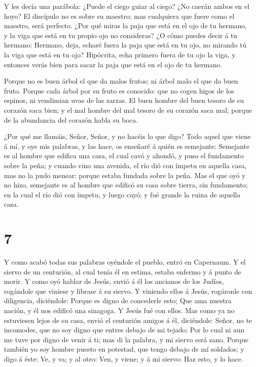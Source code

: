  Y les decía una parábola: ¿Puede el ciego guiar al ciego?
¿No caerán ambos en el hoyo?  El discípulo no es sobre su
maestro; mas cualquiera que fuere como el maestro, será perfecto.
 ¿Por qué miras la paja que está en el ojo de tu hermano, y
la viga que está en tu propio ojo no consideras?  ¿O cómo
puedes decir á tu hermano: Hermano, deja, echaré fuera la paja que está
en tu ojo, no mirando tú la viga que está en tu ojo? Hipócrita, echa
primero fuera de tu ojo la viga, y entonces verás bien para sacar la
paja que está en el ojo de tu hermano.

 Porque no es buen árbol el que da malos frutos; ni árbol
malo el que da buen fruto.  Porque cada árbol por su fruto
es conocido: que no cogen higos de los espinos, ni vendimian uvas de las
zarzas.  El buen hombre del buen tesoro de su corazón saca
bien; y el mal hombre del mal tesoro de su corazón saca mal; porque de
la abundancia del corazón habla su boca.

 ¿Por qué me llamáis, Señor, Señor, y no hacéis lo que
digo?  Todo aquel que viene á mí, y oye mis palabras, y las
hace, os enseñaré á quién es semejante:  Semejante es al
hombre que edifica una casa, el cual cavó y ahondó, y puso el fundamento
sobre la peña; y cuando vino una avenida, el río dió con ímpetu en
aquella casa, mas no la pudo menear: porque estaba fundada sobre la
peña.  Mas el que oyó y no hizo, semejante es al hombre que
edificó su casa sobre tierra, sin fundamento; en la cual el río dió con
ímpetu, y luego cayó; y fué grande la ruina de aquella casa.

\hypertarget{section-6}{%
\section{7}\label{section-6}}

 Y como acabó todas sus palabras oyéndole el pueblo, entró
en Capernaum.  Y el siervo de un centurión, al cual tenía él
en estima, estaba enfermo y á punto de morir.  Y como oyó
hablar de Jesús, envió á él los ancianos de los Judíos, rogándole que
viniese y librase á su siervo.  Y viniendo ellos á Jesús,
rogáronle con diligencia, diciéndole: Porque es digno de concederle
esto;  Que ama nuestra nación, y él nos edificó una
sinagoga.  Y Jesús fué con ellos. Mas como ya no estuviesen
lejos de su casa, envió el centurión amigos á él, diciéndole: Señor, no
te incomodes, que no soy digno que entres debajo de mi tejado;
 Por lo cual ni aun me tuve por digno de venir á ti; mas di
la palabra, y mi siervo será sano.  Porque también yo soy
hombre puesto en potestad, que tengo debajo de mí soldados; y digo á
éste: Ve, y va; y al otro: Ven, y viene; y á mi siervo: Haz esto, y lo
hace.

